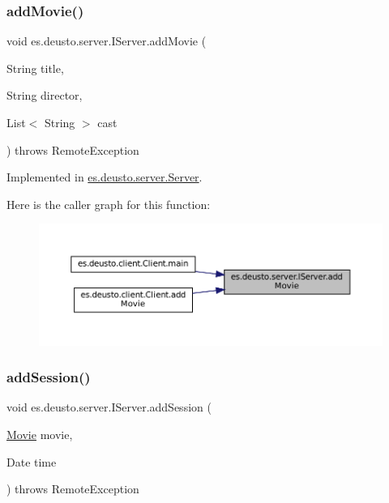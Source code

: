 \subsubsection{\texorpdfstring{addMovie()}{addMovie()}}
{\footnotesize\ttfamily void es.\+deusto.\+server.\+I\+Server.\+add\+Movie (\begin{DoxyParamCaption}\item[{String}]{title,  }\item[{String}]{director,  }\item[{List$<$ String $>$}]{cast }\end{DoxyParamCaption}) throws Remote\+Exception}



Implemented in \mbox{\hyperlink{classes_1_1deusto_1_1server_1_1_server_a150317903dc393d29f39db81e79131e0}{es.\+deusto.\+server.\+Server}}.

Here is the caller graph for this function\+:
\nopagebreak
\begin{figure}[H]
\begin{center}
\leavevmode
\includegraphics[width=350pt]{interfacees_1_1deusto_1_1server_1_1_i_server_a393d8689e14b3534dfa425e4c900532e_icgraph}
\end{center}
\end{figure}
\mbox{\label{interfacees_1_1deusto_1_1server_1_1_i_server_a1e1a4e176284ef7aec05142fb85b9a72}} 
\subsubsection{\texorpdfstring{addSession()}{addSession()}}
{\footnotesize\ttfamily void es.\+deusto.\+server.\+I\+Server.\+add\+Session (\begin{DoxyParamCaption}\item[{\mbox{\hyperlink{classes_1_1deusto_1_1server_1_1jdo_1_1_movie}{Movie}}}]{movie,  }\item[{Date}]{time }\end{DoxyParamCaption}) throws Remote\+Exception}



